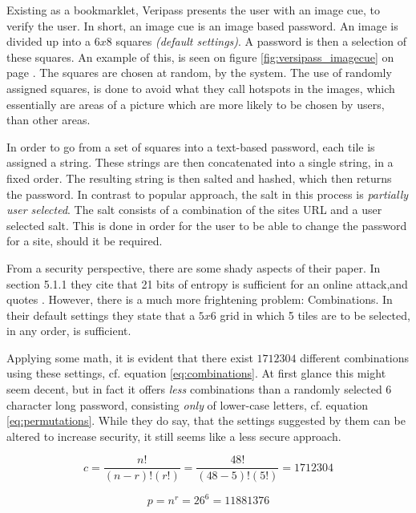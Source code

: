 			Existing as a bookmarklet, Veripass presents the user with an image cue, to verify the user. In short, an image cue is an image based password. An image is divided up into a $6x8$ squares \emph{(default settings)}. A password is then a selection of these squares. An example of this, is seen on figure \ref{fig:versipass_imagecue} on page \pageref{fig:versipass_imagecue}. The squares are chosen at random, by the system. The use of randomly assigned squares, is done to avoid what they call hotspots in the images, which essentially are areas of a picture which are more likely to be chosen by users, than other areas. 

			In order to go from a set of squares into a text-based password, each tile is assigned a string. These strings are then concatenated into a single string, in a fixed order. The resulting string is then salted and hashed, which then returns the password. In contrast to popular approach, the salt in this process is \emph{ partially user selected}. The salt consists of a combination of the sites URL and a user selected salt. This is done in order for the user to be able to change the password for a site, should it be required.

			From a security perspective, there are some shady aspects of their paper. In section 5.1.1 they cite that 21 bits of entropy is sufficient for an online attack,and quotes \cite{florencio2014}. However, there is a much more frightening problem: Combinations. In their default settings they state that a $5x6$ grid in which 5 tiles are to be selected, in any order, is sufficient.

			Applying some math, it is evident that there exist $1712304$ different combinations using these settings, cf. equation \ref{eq:combinations}. At first glance this might seem decent, but in fact it offers \emph{less} combinations than a randomly selected $6$ character long password, consisting \emph{only} of lower-case letters, cf. equation \ref{eq:permutations}. While they do say, that the settings suggested by them can be altered to increase security, it still seems like a less secure approach.

			\begin{equation}
				c = \frac{n!}{(n-r)!(r!)} = \frac{48!}{(48-5)!(5!)} = 1712304
				\label{eq:combinations}
			\end{equation}


			\begin{equation}
				p = n^r = 26^6 = 11881376
				\label{eq:permutations}
			\end{equation}

